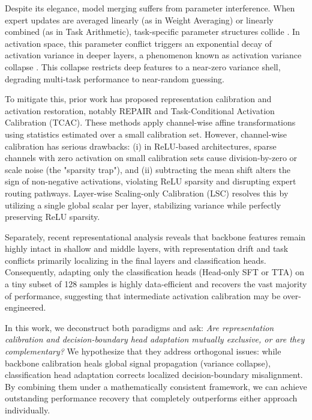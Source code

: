 \documentclass{article}
\theoremstyle{plain}
\theoremstyle{definition}
\theoremstyle{remark}
\begin{document}
Despite its elegance, model merging suffers from parameter interference. When expert updates are averaged linearly (as in Weight Averaging) or linearly combined (as in Task Arithmetic), task-specific parameter structures collide \cite{izmailov2018averaging, garipov2018loss, draxler2018essentially}. In activation space, this parameter conflict triggers an exponential decay of activation variance in deeper layers, a phenomenon known as activation variance collapse \cite{jordan2022repair}. This collapse restricts deep features to a near-zero variance shell, degrading multi-task performance to near-random guessing.

To mitigate this, prior work has proposed representation calibration and activation restoration, notably REPAIR \cite{jordan2022repair} and Task-Conditional Activation Calibration (TCAC). These methods apply channel-wise affine transformations using statistics estimated over a small calibration set. However, channel-wise calibration has serious drawbacks: (i) in ReLU-based architectures, sparse channels with zero activation on small calibration sets cause division-by-zero or scale noise (the "sparsity trap"), and (ii) subtracting the mean shift alters the sign of non-negative activations, violating ReLU sparsity and disrupting expert routing pathways. Layer-wise Scaling-only Calibration (LSC) resolves this by utilizing a single global scalar per layer, stabilizing variance while perfectly preserving ReLU sparsity.

Separately, recent representational analysis reveals that backbone features remain highly intact in shallow and middle layers, with representation drift and task conflicts primarily localizing in the final layers and classification heads. Consequently, adapting only the classification heads (Head-only SFT or TTA) on a tiny subset of 128 samples is highly data-efficient and recovers the vast majority of performance, suggesting that intermediate activation calibration may be over-engineered.

In this work, we deconstruct both paradigms and ask: \textit{Are representation calibration and decision-boundary head adaptation mutually exclusive, or are they complementary?} We hypothesize that they address orthogonal issues: while backbone calibration heals global signal propagation (variance collapse), classification head adaptation corrects localized decision-boundary misalignment. By combining them under a mathematically consistent framework, we can achieve outstanding performance recovery that completely outperforms either approach individually.
\end{document}
